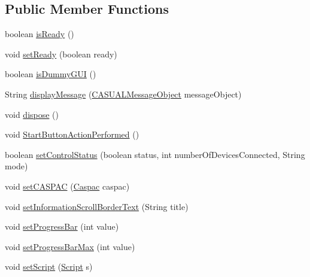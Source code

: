 \subsection*{Public Member Functions}
\begin{DoxyCompactItemize}
\item 
boolean \hyperlink{interface_c_a_s_u_a_l_1_1i_c_a_s_u_a_l_u_i_a7a0e691d9929281acda4ff3d43920ef1}{is\-Ready} ()
\item 
void \hyperlink{interface_c_a_s_u_a_l_1_1i_c_a_s_u_a_l_u_i_af1d85ae44e43579bd616159f03d50aac}{set\-Ready} (boolean ready)
\item 
boolean \hyperlink{interface_c_a_s_u_a_l_1_1i_c_a_s_u_a_l_u_i_af66ddc3e3fd6c75e3051e4df37fd8caa}{is\-Dummy\-G\-U\-I} ()
\item 
String \hyperlink{interface_c_a_s_u_a_l_1_1i_c_a_s_u_a_l_u_i_a3006dd3854d94e71cbf3b7e8fb41526e}{display\-Message} (\hyperlink{class_c_a_s_u_a_l_1_1_c_a_s_u_a_l_message_object}{C\-A\-S\-U\-A\-L\-Message\-Object} message\-Object)
\item 
void \hyperlink{interface_c_a_s_u_a_l_1_1i_c_a_s_u_a_l_u_i_a2bb87372743ef5c1b521bea486966602}{dispose} ()
\item 
void \hyperlink{interface_c_a_s_u_a_l_1_1i_c_a_s_u_a_l_u_i_a8dcf6547f0bf15b2fb7ac176d8e649c1}{Start\-Button\-Action\-Performed} ()
\item 
boolean \hyperlink{interface_c_a_s_u_a_l_1_1i_c_a_s_u_a_l_u_i_ace3102109e6aa86eaaf263688caf4dab}{set\-Control\-Status} (boolean status, int number\-Of\-Devices\-Connected, String mode)
\item 
void \hyperlink{interface_c_a_s_u_a_l_1_1i_c_a_s_u_a_l_u_i_ad86ba812a34d5e91dcabd5c5d7d46947}{set\-C\-A\-S\-P\-A\-C} (\hyperlink{class_c_a_s_u_a_l_1_1caspac_1_1_caspac}{Caspac} caspac)
\item 
void \hyperlink{interface_c_a_s_u_a_l_1_1i_c_a_s_u_a_l_u_i_a749ee2c14a51fd48dd41a20eefd36a5c}{set\-Information\-Scroll\-Border\-Text} (String title)
\item 
void \hyperlink{interface_c_a_s_u_a_l_1_1i_c_a_s_u_a_l_u_i_a68a8260ef815b46468f1a82152cda270}{set\-Progress\-Bar} (int value)
\item 
void \hyperlink{interface_c_a_s_u_a_l_1_1i_c_a_s_u_a_l_u_i_a6db157f7a196e2166900b405e79d145d}{set\-Progress\-Bar\-Max} (int value)
\item 
void \hyperlink{interface_c_a_s_u_a_l_1_1i_c_a_s_u_a_l_u_i_a667b718d782cf870788e0c7c503e17af}{set\-Script} (\hyperlink{class_c_a_s_u_a_l_1_1caspac_1_1_script}{Script} s)
\item 

\end{DoxyCompactItemize}

